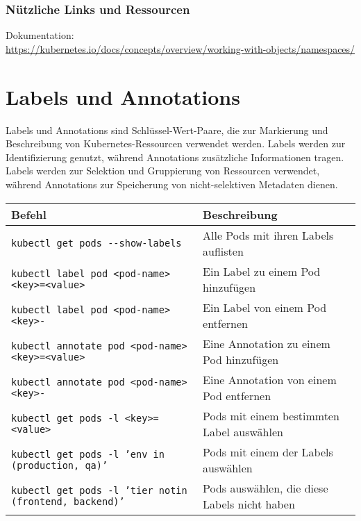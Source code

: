 \subsubsection{Nützliche Links und Ressourcen}
Dokumentation:\\
\url{https://kubernetes.io/docs/concepts/overview/working-with-objects/namespaces/}
\newpage
\section{Labels und Annotations}
Labels und Annotations sind Schlüssel-Wert-Paare, die zur Markierung und Beschreibung von Kubernetes-Ressourcen verwendet werden.
Labels werden zur Identifizierung genutzt, während Annotations zusätzliche Informationen tragen.
Labels werden zur Selektion und Gruppierung von Ressourcen verwendet, während Annotations zur Speicherung von nicht-selektiven Metadaten dienen. \\

\noindent
\begin{tabular}{|l|l|}
\hline
\textbf{Befehl} & \textbf{Beschreibung} \\
\hline
\texttt{kubectl get pods {-}{-}show-labels} & Alle Pods mit ihren Labels auflisten \\
\texttt{kubectl label pod <pod-name> <key>=<value>} & Ein Label zu einem Pod hinzufügen \\
\texttt{kubectl label pod <pod-name> <key>-} & Ein Label von einem Pod entfernen \\
\texttt{kubectl annotate pod <pod-name> <key>=<value>} & Eine Annotation zu einem Pod hinzufügen \\
\texttt{kubectl annotate pod <pod-name> <key>-} & Eine Annotation von einem Pod entfernen \\
\texttt{kubectl get pods -l <key>=<value>} & Pods mit einem bestimmten Label auswählen \\
\texttt{kubectl get pods -l 'env in (production, qa)'} & Pods mit einem der Labels auswählen\\
\texttt{kubectl get pods -l 'tier notin (frontend, backend)'} & Pods auswählen, die diese Labels nicht haben \\
\hline
\end{tabular}

